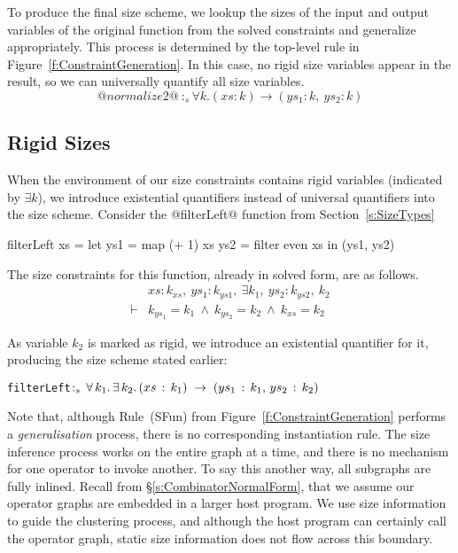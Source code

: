 To produce the final size scheme, we lookup the sizes of the input and output variables of the original function from the solved constraints and generalize appropriately. This process is determined by the top-level rule in Figure~\ref{f:ConstraintGeneration}. In this case, no rigid size variables appear in the result, so we can universally quantify all size variables.
$$@normalize2@ ~:_s \forall k. (xs : k) \to (ys_1 : k,~ ys_2 : k)
$$




\subsection{Rigid Sizes}
When the environment of our size constraints contains rigid variables (indicated by $\exists k$), we introduce existential quantifiers instead of universal quantifiers into the size scheme. Consider the @filterLeft@ function from Section~\ref{s:SizeTypes}
\begin{code}
      filterLeft xs
        = let ys1 = map (+ 1)   xs
              ys2 = filter even xs
          in (ys1, ys2)
\end{code}
The size constraints for this function, already in solved form, are as follows.
$$
\begin{array}{ll}
       & xs : k_{xs},~ ys_1 : k_{ys1},~ \exists k_1,~ ys_2 : k_{ys2},~ k_2
\\
\vdash &          k_{ys_1} = k_1
        ~\wedge~  k_{ys_2} = k_2
        ~\wedge~  k_{xs}   = k_2
\end{array}
$$

As variable $k_2$ is marked as rigid, we introduce an existential quantifier for it, producing the size scheme stated earlier:

\begin{alltt}
   filterLeft \(:\sb{s}\,\forall\,k\sb{1}.\,\exists\,k\sb{2}.\,(xs\,:\,k\sb{1})\;\to\;(ys\sb{1}\,:\,k\sb{1},\,ys\sb{2}\,:\,k\sb{2})\)
\end{alltt}

Note that, although Rule~(SFun) from Figure~\ref{f:ConstraintGeneration} performs a \emph{generalisation} process, there is no corresponding instantiation rule. The size inference process works on the entire graph at a time, and there is no mechanism for one operator to invoke another. To say this another way, all subgraphs are fully inlined. Recall from \S\ref{s:CombinatorNormalForm}, that we assume our operator graphs are embedded in a larger host program. We use size information to guide the clustering process, and although the host program can certainly call the operator graph, static size information does not flow across this boundary.

